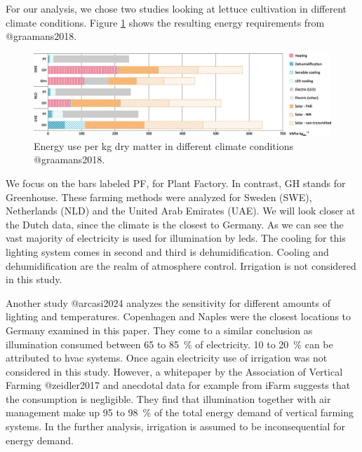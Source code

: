 For our analysis, we chose two studies looking at lettuce cultivation in different climate conditions.
Figure \ref{fig:energy-sensitivity} shows the resulting energy requirements from @graamans2018.
\begin{figure}[htbp]
  \centering
  \includegraphics[width=\textwidth]{img/energy-sensitivity.jpg}
  \caption{Energy use per \si{\kg} dry matter in different climate conditions @graamans2018.}
  \label{fig:energy-sensitivity}
\end{figure}
We focus on the bars labeled PF, for Plant Factory.
In contrast, GH stands for Greenhouse.
These farming methods were analyzed for Sweden (SWE), Netherlands (NLD) and the United Arab Emirates (UAE).
We will look closer at the Dutch data, since the climate is the closest to Germany.
As we can see the vast majority of electricity is used for illumination by \acp{led}.
The cooling for this lighting system comes in second and third is dehumidification.
Cooling and dehumidification are the realm of atmosphere control.
Irrigation is not considered in this study.

Another study @arcasi2024 analyzes the sensitivity for different amounts of lighting and temperatures.
Copenhagen and Naples were the closest locations to Germany examined in this paper.
They come to a similar conclusion as illumination consumed between 65 to \SI{85}{\percent} of electricity.
10 to \SI{20}{\percent} can be attributed to \ac{hvac} systems.
Once again electricity use of irrigation was not considered in this study.
However, a whitepaper by the Association of Vertical Farming @zeidler2017 and anecdotal data for example from iFarm suggests that the consumption is negligible.
They find that illumination together with air management make up 95 to \SI{98}{\percent} of the total energy demand of vertical farming systems.
In the further analysis, irrigation is assumed to be inconsequential for energy demand.

